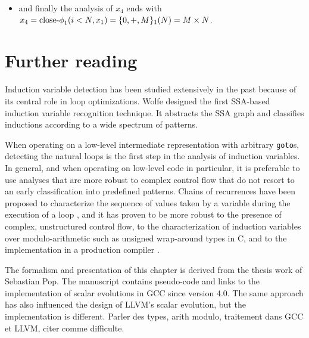 {\begin{itemize}
\begin{itemize}
\begin{itemize}
      $x_2$ we apply $M$ to the scalar evolution of $x_3$, leading
      to $x_2 = \CHREC{x_1, +, 1}_2 (M) = x_1 + M$;
    \end{itemize}
  \item the scalar evolution analysis of $x_1$ then leads to $x_1 =
    \textrm{\loopphi}_1 (x_0, x_2) = \textrm{\loopphi}_1 (x_0, x_1 + M) = \CHREC{x_0, +, M}_1 =
    \CHREC{0, +, M}_1$
  \end{itemize}
\item and finally the analysis of $x_4$ ends with $x_4 = \textrm{close-$\phi$}_1 (i
  < N, x_1) = \{0, +, M\}_1 (N) = M \times N$.
\end{itemize}


\section{Further reading}

Induction variable detection has been studied extensively in the past
because of its central role in loop optimizations. Wolfe \cite{Wol92}
designed the first SSA-based induction variable recognition
technique. It abstracts the SSA graph and classifies inductions
according to a wide spectrum of patterns.

When operating on a low-level intermediate representation with
arbitrary \texttt{goto}s, detecting the natural loops is the first
step in the analysis of induction variables. In general, and when
operating on low-level code in particular, it is preferable to use
analyses that are more robust to complex control flow that do not
resort to an early classification into predefined patterns.  Chains of
recurrences \cite{BWZ94,KMZ98,Zim01} have been proposed to
characterize the sequence of values taken by a variable during the
execution of a loop \cite{vEn01}, and it has proven to be more robust
to the presence of complex, unstructured control flow, to the
characterization of induction variables over modulo-arithmetic such as
unsigned wrap-around types in C, and to the implementation in a
production compiler \cite{Pop05}.

The formalism and presentation of this chapter is derived from the
thesis work of Sebastian Pop. The manuscript \cite{TPop} contains
pseudo-code and links to the implementation of scalar evolutions in
GCC since version 4.0. The same approach has also influenced the
design of LLVM's scalar evolution, but the implementation is
different.  Parler des types, arith modulo, traitement dans GCC et
LLVM, citer comme difficulte.

}

